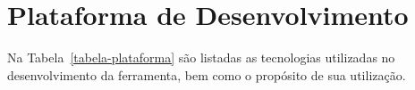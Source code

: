 \chapter{Plataforma de Desenvolvimento}
\label{sec-plataforma}
\vspace{-1cm}




Na Tabela~\ref{tabela-plataforma} são listadas as tecnologias utilizadas no desenvolvimento da ferramenta, bem como o propósito de sua utilização.

